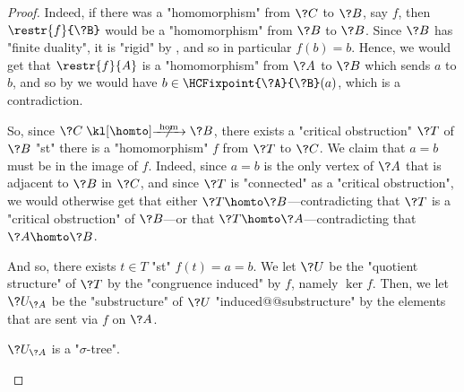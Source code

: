 \begin{proof}
	Indeed, if there was a "homomorphism" from $\?C$ to $\?B$, say $f$, then
	$\restr{f}{\?B}$ would be a "homomorphism" from $\?B$ to $\?B$.
	Since $\?B$ has "finite duality", it is "rigid" by , and so in particular $f(b) = b$.
	Hence, we would get that $\restr{f}{A}$ is a "homomorphism" from $\?A$ to $\?B$
	which sends $a$ to $b$, and so by 
	we would have $b \in \HCFixpoint{\?A}{\?B}(a)$, which is a contradiction.

	So, since $\?C \nothomto \?B$, there exists a "critical obstruction" $\?T$ of $\?B$
	"st" there is a "homomorphism" $f$ from $\?T$ to $\?C$. 
	We claim that $a=b$ must be in the image of $f$. Indeed, since $a=b$ is the only vertex
	of $\?A$ that is adjacent to $\?B$ in $\?C$, and since $\?T$ is "connected" as a
	"critical obstruction",
	we would otherwise get that either $\?T \homto \?B$---contradicting that $\?T$ is a "critical obstruction" of $\?B$---or that $\?T \homto \?A$---contradicting that $\?A \homto \?B$.
	
	And so, there exists $t \in T$ "st" $f(t) = a = b$.
	We let $\?U$ be the "quotient structure" of $\?T$ by the "congruence induced" by $f$,
	namely $\ker{f}$. Then, we let $\?U_{\?A}$ be the "substructure" of $\?U$
	"induced@@substructure" by the elements that are sent via $f$ on $\?A$.

	\begin{claim}
		\AP\label{claim:hyperedge-consistency-uniform-convergence-trees-are-trees}
		$\?U_{\?A}$ is a "$\sigma$-tree".
	\end{claim}


\end{proof}

